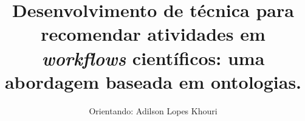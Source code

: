 \documentclass[compress, hyperref={pdfpagelayout=SinglePage}]{beamer}
\title[Defesa]{Desenvolvimento de técnica para recomendar atividades em \emph{workflows} científicos: uma abordagem baseada em ontologias.}
\author{Orientando: Adilson Lopes Khouri}
\institute[USP]{Orientador: Prof. Dr. Luciano Antonio Digiampietri}
\begin{document}
\begin{frame}
  \titlepage
\end{frame}













\end{document}
